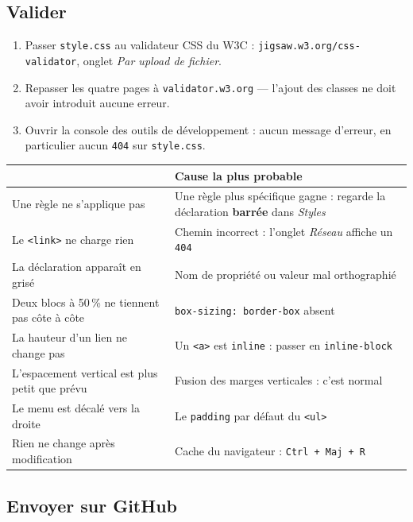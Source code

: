\documentclass[a4paper,11pt]{article}
\newcommand{\hdr}[1]{\multicolumn{1}{l}{\color{white}\bfseries #1}}
\renewcommand{\arraystretch}{1.3}
\begin{document}
\subsection{Valider}

\begin{enumerate}
  \item Passer \texttt{style.css} au validateur CSS du W3C : \texttt{jigsaw.w3.org/css-validator}, onglet \textit{Par upload de fichier}.
  \item Repasser les quatre pages à \texttt{validator.w3.org} --- l'ajout des classes ne doit avoir introduit aucune erreur.
  \item Ouvrir la console des outils de développement : aucun message d'erreur, en particulier aucun \texttt{404} sur \texttt{style.css}.
\end{enumerate}

\begin{center}
\renewcommand{\arraystretch}{1.0}
\begin{tabularx}{\linewidth}{p{6.1cm}X}
  \toprule
  \rowcolor{uniNavy}
  \hdr{Symptôme fréquent cette semaine} & \hdr{Cause la plus probable} \\
  \midrule
  \rowcolor{uniPaper}
  Une règle ne s'applique pas & Une règle plus spécifique gagne : regarde la déclaration \textbf{barrée} dans \textit{Styles} \\
  Le \texttt{<link>} ne charge rien & Chemin incorrect : l'onglet \textit{Réseau} affiche un \texttt{404} \\
  \rowcolor{uniPaper}
  La déclaration apparaît en grisé & Nom de propriété ou valeur mal orthographié \\
  Deux blocs à 50\,\% ne tiennent pas côte à côte & \texttt{box-sizing: border-box} absent \\
  \rowcolor{uniPaper}
  La hauteur d'un lien ne change pas & Un \texttt{<a>} est \texttt{inline} : passer en \texttt{inline-block} \\
  L'espacement vertical est plus petit que prévu & Fusion des marges verticales : c'est normal \\
  \rowcolor{uniPaper}
  Le menu est décalé vers la droite & Le \texttt{padding} par défaut du \texttt{<ul>} \\
  Rien ne change après modification & Cache du navigateur : \texttt{Ctrl + Maj + R} \\
  \bottomrule
\end{tabularx}
\end{center}

\subsection{Envoyer sur GitHub}
\end{document}
